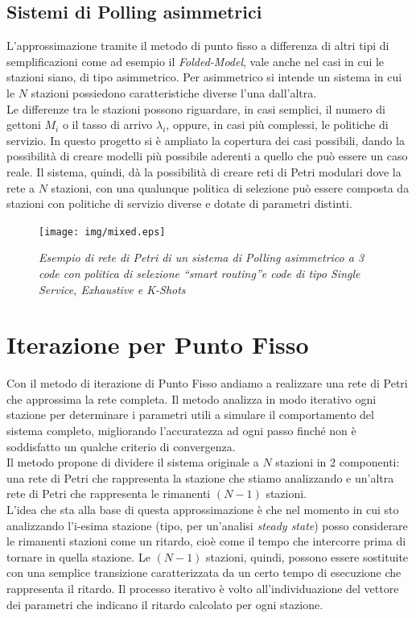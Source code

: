 \documentclass[12pt,a4paper,italian]{article}
\begin{document}
\subsection{Sistemi di Polling asimmetrici}
L'approssimazione tramite il metodo di punto fisso a differenza di altri tipi di semplificazioni come ad esempio il \emph{Folded-Model}\cite{fixedpoint}, vale anche nel casi in cui le stazioni siano, di tipo asimmetrico. Per asimmetrico si intende un sistema in cui le $N$ stazioni possiedono caratteristiche diverse l'una dall'altra.\\ 
Le differenze tra le stazioni possono riguardare, in casi semplici, il numero di gettoni $M_i$ o il tasso di arrivo $\lambda_i$, oppure, in casi più complessi, le politiche di servizio. 
In questo progetto si è ampliato la copertura dei casi possibili, dando la possibilità di creare modelli più possibile aderenti a quello che può essere un caso reale. Il sistema,    quindi, dà la possibilità di creare reti di Petri modulari dove la rete a $N$ stazioni, con una qualunque politica di selezione può essere composta da stazioni con politiche di servizio diverse e dotate di parametri distinti.
\begin{figure}[h!]
	\centering
	\texttt{[image: img/mixed.eps]}
	\caption{\emph{Esempio di rete di Petri di un sistema di Polling asimmetrico a 3 code con politica di selezione \textquotedblleft smart routing\textquotedblright  e code di tipo Single Service, Exhaustive e K-Shots}}
\end{figure}
\newpage
\section{Iterazione per Punto Fisso}
\thispagestyle{plain}
Con il metodo di iterazione di Punto Fisso andiamo a realizzare una rete di Petri che approssima la rete completa. Il metodo analizza in modo iterativo ogni stazione per determinare i parametri utili a simulare il comportamento del sistema completo, migliorando l'accuratezza ad ogni passo finché non è soddisfatto un qualche criterio di convergenza. \\ Il metodo propone di dividere il sistema originale a $N$ stazioni in 2 componenti: una rete di Petri che rappresenta la stazione che stiamo analizzando e un'altra rete di Petri che rappresenta le rimanenti $(N-1)$ stazioni.\\ L'idea che sta alla base di questa approssimazione è che nel momento in cui sto analizzando l'i-esima stazione (tipo, per un'analisi \emph{steady state}) posso considerare le rimanenti stazioni come un ritardo, cioè come il tempo che intercorre prima di tornare in quella stazione. Le $(N-1)$ stazioni, quindi, possono essere sostituite con una semplice transizione caratterizzata da un certo tempo di esecuzione che rappresenta il ritardo. Il processo iterativo è volto all'individuazione del vettore dei parametri che indicano il ritardo calcolato per ogni stazione.
\end{document}
